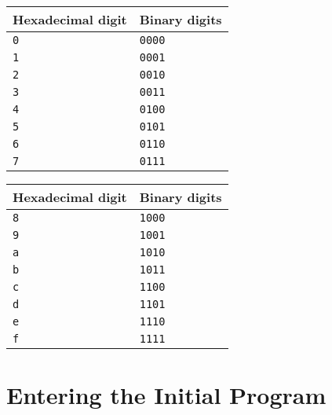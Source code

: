 \documentclass[a4paper,12pt]{article}
\newcommand{\num}[1]{\texttt{\MakeLowercase{#1}}}
\theoremstyle{definition}
\begin{document}
\begin{center}
  \begin{tabular}{@{}ll@{}}
    Hexadecimal digit & Binary digits \\
    \hline
    \num{0}           & \num{0000}   \\
    \num{1}           & \num{0001}   \\
    \num{2}           & \num{0010}   \\
    \num{3}           & \num{0011}   \\
    \num{4}           & \num{0100}   \\
    \num{5}           & \num{0101}   \\
    \num{6}           & \num{0110}   \\
    \num{7}           & \num{0111}   \\
    \hline
  \end{tabular}
  \hfil
  \begin{tabular}{@{}ll@{}}
    Hexadecimal digit & Binary digits \\
    \hline
    \num{8}           & \num{1000}   \\
    \num{9}           & \num{1001}   \\
    \num{A}           & \num{1010}   \\
    \num{B}           & \num{1011}   \\
    \num{C}           & \num{1100}   \\
    \num{D}           & \num{1101}   \\
    \num{E}           & \num{1110}   \\
    \num{F}           & \num{1111}   \\
    \hline
  \end{tabular}
\end{center}

\section{Entering the Initial Program}
\label{sec:entering-initial-program}
\end{document}
